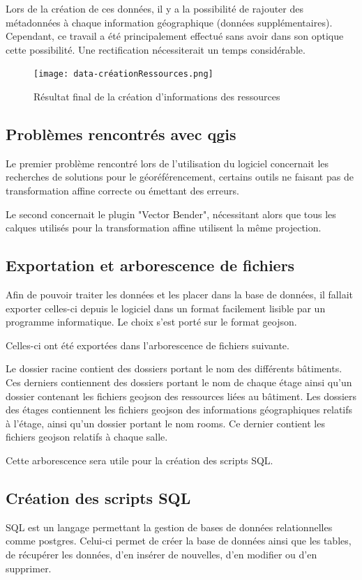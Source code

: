 \documentclass[
    iai, %
    il, %
]{heig-tb}
\begin{document}
Lors de la création de ces données, il y a la possibilité de rajouter des métadonnées à chaque information géographique
(données supplémentaires). Cependant, ce travail a été principalement effectué sans avoir dans son optique cette possibilité.
Une rectification nécessiterait un temps considérable.


\begin{figure}[h]
    \centering
    \texttt{[image: data-créationRessources.png]}
    \caption{Résultat final de la création d'informations des ressources}
    \label{fig:ressources}
\end{figure}

\subsection{Problèmes rencontrés avec \gls{qgis}}
Le premier problème rencontré lors de l'utilisation du logiciel concernait les recherches de solutions pour le géoréférencement,
certains outils ne faisant pas de transformation affine correcte ou émettant des erreurs.

Le second concernait le plugin "Vector Bender", nécessitant alors que tous les calques utilisés pour la transformation affine utilisent la même projection.

\subsection{Exportation et arborescence de fichiers}
Afin de pouvoir traiter les données et les placer dans la base de données,
il fallait exporter celles-ci depuis le logiciel dans un format facilement lisible par un programme informatique.
Le choix s'est porté sur le format \gls{geojson}.

Celles-ci ont été exportées dans l'arborescence de fichiers suivante.

Le dossier racine contient des dossiers portant le nom des différents bâtiments.
Ces derniers contiennent des dossiers portant le nom de chaque étage ainsi qu'un dossier contenant les fichiers \gls{geojson} des ressources liées au bâtiment.
Les dossiers des étages contiennent les fichiers \gls{geojson} des informations géographiques relatifs à l'étage, ainsi qu'un dossier portant le nom rooms.
Ce dernier contient les fichiers \gls{geojson} relatifs à chaque salle.

Cette arborescence sera utile pour la création des scripts SQL.

\subsection{Création des scripts SQL}
SQL est un langage permettant la gestion de bases de données relationnelles comme \gls{postgres}.
Celui-ci permet de créer la base de données ainsi que les tables, de récupérer les données, d'en insérer de nouvelles, d'en modifier ou d'en supprimer.
\end{document}
